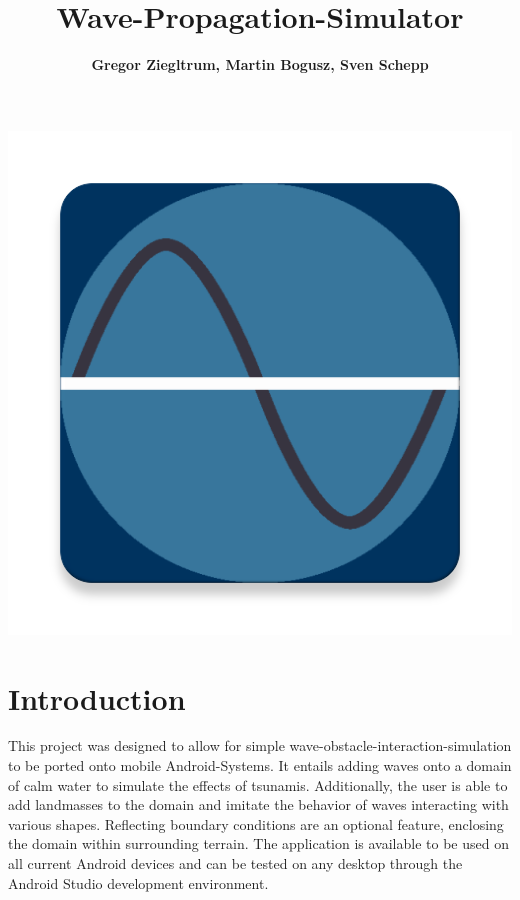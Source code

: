 \documentclass[11pt,a4paper]{article}
\begin{document}
\marginsize{2.5cm}{3cm}{2.5cm}{2cm}
\makeatletter
\def\ps@myPS{%
    \def\@oddfoot{\null\hfill\thepage}
    \def\@evenfoot{\thepage}%
    \def\@evenhead{\null\hfil\slshape\leftmark}%
    \def\@oddhead{{\slshape\rightmark}}}%
\makeatother
\pagestyle{myPS}

\author{\textbf{Gregor Ziegltrum, Martin Bogusz, Sven Schepp}}
\title{\textbf{Wave-Propagation-Simulator}}
\maketitle
\linespread{1.8}

\begin{center}
\includegraphics[scale=0.30]{ic_launcher-web.png}
\end{center}



\pagebreak
\thispagestyle{empty}
\tableofcontents
\pagebreak


\section{Introduction}

This project was designed to allow for simple wave-obstacle-interaction-simulation to be ported onto mobile Android-Systems. It entails adding waves onto a domain of calm water to simulate the effects of tsunamis. Additionally, the user is able to add landmasses to the domain and imitate the behavior of waves interacting with various shapes. Reflecting boundary conditions are an optional feature, enclosing the domain within surrounding terrain. The application is available to be used on all current Android devices and can be tested on any desktop through the Android Studio development environment.
\end{document}
